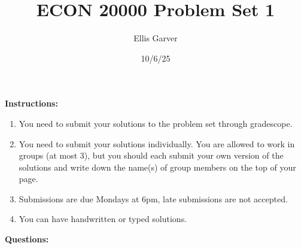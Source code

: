 \documentclass{article}
\title{ECON 20000 Problem Set 1}
\author{Ellis Garver}
\date{10/6/25}
\begin{document}
\maketitle
\item[] 
\textbf{Instructions:}
\begin{enumerate}
\item You need to submit your solutions to the problem set through gradescope. 
\item You need to submit your solutions individually. You are allowed to work in groups (at most 3), but you should each submit your own version of the solutions and write down the name(s) of group members on the top of your page.
\item Submissions are due Mondays at 6pm, late submissions are not accepted.
\item You can have handwritten or typed solutions. 
\end{enumerate}
 \textbf{Questions:}
\end{document}
